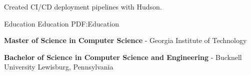 \documentclass[MMMMyyyy,nonstopmode]{simpleresumecv_stacked}
\newif\ifLOCATION
\newif\ifNOTSELECTED
\begin{document}
\begin{Body}
\begin{Detail}
	Created CI/CD deployment pipelines with Hudson.
\end{Detail}
\fi %


\ifNOTSELECTED
\begin{Detail}
Created applications to build DSL circuits and track sales commissions in Java and SQL.
\end{Detail}
\fi %

\ifNOTSELECTED
\Gap
\Entry
\textbf{Senior Software Engineer}, Global Crossing/Level3

\begin{Detail}
Led multi-site teams to create telecom applications in Java and SQL.
\end{Detail}
\fi %

\ifNOTSELECTED
\begin{Detail}
Created trading systems for equity derivatives and HFT trading desks in C, C++, and Excel.
\end{Detail}
\fi %

\ifNOTSELECTED
\begin{Detail}
Developed systems for MBS mortgage, Treasury, and Repo trading desks in C and C++.
\end{Detail}
\fi %
\fi %
%

\Section
{Education}
{Education}
{PDF:Education}

\Entry
\textbf{Master of Science in Computer Science} -
Georgia Institute of Technology %

\ifNOTSELECTED %
\BulletItem
Coursework: Compiler Optimization, CPU Architecture, LLVM Software Analysis, Applied ML and AI
\fi %

\iftrue %

\Entry
\textbf{Bachelor of Science in Computer Science and Engineering} - 
Bucknell University
\ifLOCATION
\hfill Lewisburg, Pennsylvania
\fi


\end{Body}
\end{document}
